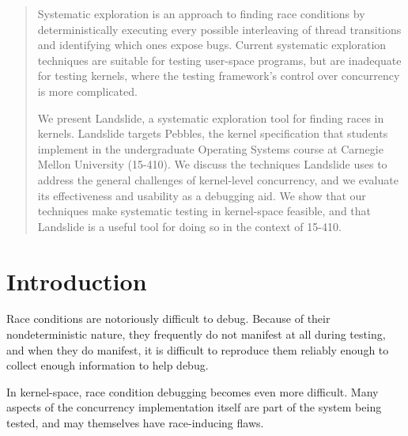 \documentclass[12pt]{book}
\begin{document}



\newcommand\true{\;\textit{true}}
\newcommand\false{\;\textit{false}}

\newcommand\alpher\alpha
\newcommand\beter\beta
\newcommand\gammer\gamma
\newcommand\delter\delta
\newcommand\zeter\zeta
\newcommand\Sigmer\Sigma

\newcommand\NN{\mathbb{N}}
\newcommand\QQ{\mathbb{Q}}
\newcommand\RR{\mathbb{R}}
\newcommand\ZZ{\mathbb{Z}}

\begin{abstract}
Systematic exploration is an approach to finding race conditions by deterministically executing every possible interleaving of thread transitions and identifying which ones expose bugs.
Current systematic exploration techniques are suitable for testing user-space programs, but are inadequate for testing kernels, where the testing framework's control over concurrency is more complicated.

We present Landslide, a systematic exploration tool for finding races in kernels.
Landslide targets Pebbles, the kernel specification that students implement in the undergraduate Operating Systems course at Carnegie Mellon University (15-410).
We discuss the techniques Landslide uses to address the general challenges of kernel-level concurrency, and we evaluate its effectiveness and usability as a debugging aid.
We show that our techniques make systematic testing in kernel-space feasible, and that Landslide is a useful tool for doing so in the context of 15-410.
\end{abstract}



\chapter{Introduction}

Race conditions are notoriously difficult to debug.
Because of their nondeterministic nature, they frequently do not manifest at all during testing, and when they do manifest, it is difficult to reproduce them reliably enough to collect enough information to help debug.

In kernel-space, race condition debugging becomes even more difficult. Many aspects of the concurrency implementation itself are part of the system being tested, and may themselves have race-inducing flaws.
\end{document}
